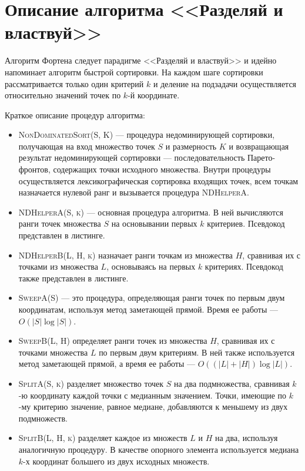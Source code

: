 \section{Описание алгоритма <<Разделяй и властвуй>>}
Алгоритм Фортена следует парадигме <<Разделяй и властвуй>> и идейно напоминает алгоритм быстрой сортировки.
На каждом шаге сортировки рассматривается только один критерий $k$ и деление на подзадачи осуществляется относительно значений точек по $k$-й координате.

Краткое описание процедур алгоритма:
\begin{itemize}
    \item \textsc{NonDominatedSort(S, K)} --- процедура недоминирующей сортировки, получающая на вход множество точек $S$ и размерность $K$ и возвращающая результат недоминирующей сортировки --- последовательность Парето-фронтов, содержащих точки исходного множества.
Внутри процедуры осуществляется лексикографическая сортировка входящих точек, всем точкам назначается нулевой ранг и вызывается процедура \textsc{NDHelperA}.
    \item \textsc{NDHelperA(S, k)} --- основная процедура алгоритма. В ней вычисляются ранги точек множества $S$ на основывании первых $k$ критериев. Псевдокод представлен в листинге.
    \item \textsc{NDHelperB(L, H, k)} назначает ранги точкам из множества $H$, сравнивая их с точками из множества $L$, основываясь на первых $k$ критериях. Псевдокод также представлен в листинге.
    \item \textsc{SweepA(S)} --- это процедура, определяющая ранги точек по первым двум координатам, используя метод заметающей прямой. Время ее работы --- $O(|S|\log|S|)$.
    \item \textsc{SweepB(L, H)} определяет ранги точек из множества $H$, сравнивая их с точками множества $L$ по первым двум критериям. В ней также используется метод заметающей прямой, а время ее работы --- $O((|L| + |H|)\log{|L|})$.
    \item \textsc{SplitA(S, k)} разделяет множество точек $S$ на два подмножества, сравнивая $k$-ю координату каждой точки с медианным значением. Точки, имеющие по $k$-му критерию значение, равное медиане, добавляются к меньшему из двух подмножеств.
    \item \textsc{SplitB(L, H, k)} разделяет каждое из множеств $L$ и $H$ на два, используя аналогичную процедуру. В качестве опорного элемента используется медиана $k$-х координат большего из двух исходных множеств.
\end{itemize}

